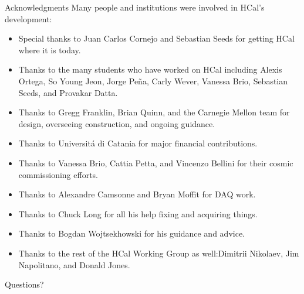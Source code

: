 \documentclass[10pt]{beamer}
\begin{document}
\begin{frame}{Acknowledgments}
\vspace{-2mm}
Many people and institutions were involved in HCal's development:
\vspace{-3mm}
    \begin{itemize}
    		\item Special thanks to \alert{Juan Carlos Cornejo} and \alert{Sebastian Seeds} for getting HCal where it is today.
        \item Thanks to the many students who have worked on HCal including \alert{Alexis Ortega}, \alert{So Young Jeon}, \alert{Jorge Pe\~{n}a}, \alert{Carly Wever}, \alert{Vanessa Brio}, \alert{Sebastian Seeds}, and \alert{Provakar Datta}. 
        \item Thanks to \alert{Gregg Franklin}, \alert{Brian Quinn}, and the \alert{Carnegie Mellon} team for design, overseeing construction, and ongoing guidance.
        \item Thanks to \alert{Universit\'{a} di Catania} for major financial contributions.
        \item Thanks to \alert{Vanessa Brio}, \alert{Cattia Petta}, and \alert{Vincenzo Bellini} for their cosmic commissioning efforts.
        \item Thanks to \alert{Alexandre Camsonne} and \alert{Bryan Moffit} for DAQ work.
        \item Thanks to \alert{Chuck Long} for all his help fixing and acquiring things.
        \item Thanks to \alert{Bogdan Wojtsekhowski} for his guidance and advice.
        \item Thanks to the rest of the HCal Working Group as well:\alert{Dimitrii Nikolaev}, \alert{Jim Napolitano}, and \alert{Donald Jones}.
    \end{itemize}

\end{frame}

\begin{frame}{Questions?}%
	
	\renewcommand*{\bibfont}{\scriptsize}%
	\printbibliography
	
\end{frame}
\end{document}
